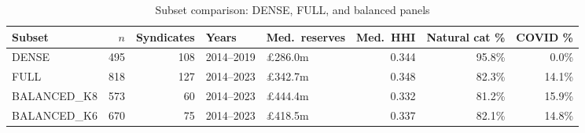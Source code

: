 \begin{table}[htbp]
\centering
\caption{Subset comparison: DENSE, FULL, and balanced panels}
\label{tab:subset_comparison}
\begin{tabular}{lrrllrrr}
\toprule
\textbf{Subset} & \textbf{$n$} & \textbf{Syndicates} & \textbf{Years} & \textbf{Med.\ reserves} & \textbf{Med.\ HHI} & \textbf{Natural cat \%} & \textbf{COVID \%} \\
\midrule
DENSE & 495 & 108 & 2014--2019 & \pounds286.0m & 0.344 & 95.8\% & 0.0\% \\
FULL & 818 & 127 & 2014--2023 & \pounds342.7m & 0.348 & 82.3\% & 14.1\% \\
BALANCED_K8 & 573 & 60 & 2014--2023 & \pounds444.4m & 0.332 & 81.2\% & 15.9\% \\
BALANCED_K6 & 670 & 75 & 2014--2023 & \pounds418.5m & 0.337 & 82.1\% & 14.8\% \\
\bottomrule
\end{tabular}
\end{table}
